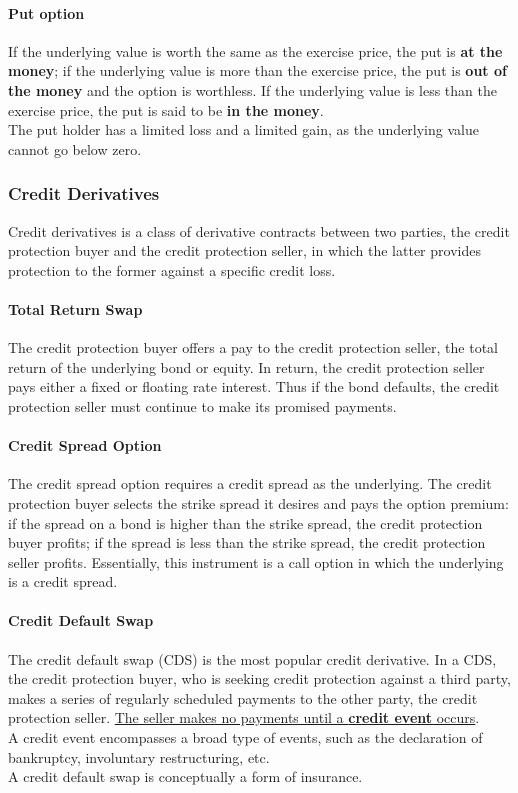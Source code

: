 \documentclass[fleqn,10pt]{SelfArx} %
\begin{document}
\paragraph{Put option} If the underlying value is worth the same as the exercise price, the put is \textbf{at the money}; if the underlying value is more than the exercise price, the put is \textbf{out of the money} and the option is worthless. If the underlying value is less than the exercise price, the put is said to be \textbf{in the money}.
\\
The put holder has a limited loss and a limited gain, as the underlying value cannot go below zero.

\subsubsection{Credit Derivatives}

Credit derivatives is a class of derivative contracts between two parties, the credit protection buyer and the credit protection seller, in which the latter provides protection to the former against a specific credit loss.

\paragraph{Total Return Swap} The credit protection buyer offers a pay to the credit protection seller, the total return of the underlying bond or equity. In return, the credit protection seller pays either a fixed or floating rate interest. Thus if the bond defaults, the credit protection seller must continue to make its promised payments.

\paragraph*{Credit Spread Option} The credit spread option requires a credit spread as the underlying. The credit protection buyer selects the strike spread it desires and pays the option premium: if the spread on a bond is higher than the strike spread, the credit protection buyer profits; if the spread is less than the strike spread, the credit protection seller profits. Essentially, this instrument is a call option in which the underlying is a credit spread.

\paragraph*{Credit Default Swap} The credit default swap (CDS) is the most popular credit derivative. In a CDS, the credit protection buyer, who is seeking credit protection against a third party, makes a series of regularly scheduled payments to the other party, the credit protection seller. \ul{The seller makes no payments until a \textbf{credit event} occurs}.
\\
A credit event encompasses a broad type of events, such as the declaration of bankruptcy, involuntary restructuring, etc.
\\
A credit default swap is conceptually a form of insurance.
\end{document}
